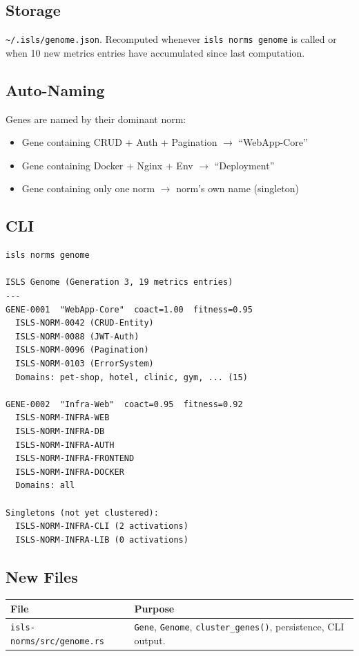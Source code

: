 \documentclass[11pt,a4paper]{article}
\begin{document}
\subsection{Storage}

\texttt{\textasciitilde/.isls/genome.json}. Recomputed whenever 
\texttt{isls norms genome} is called or when 10 new metrics 
entries have accumulated since last computation.

\subsection{Auto-Naming}

Genes are named by their dominant norm:
\begin{itemize}[nosep]
\item Gene containing CRUD + Auth + Pagination $\to$ ``WebApp-Core''
\item Gene containing Docker + Nginx + Env $\to$ ``Deployment''
\item Gene containing only one norm $\to$ norm's own name (singleton)
\end{itemize}

\subsection{CLI}

\begin{lstlisting}[style=bash]
isls norms genome

ISLS Genome (Generation 3, 19 metrics entries)
---
GENE-0001  "WebApp-Core"  coact=1.00  fitness=0.95
  ISLS-NORM-0042 (CRUD-Entity)
  ISLS-NORM-0088 (JWT-Auth)
  ISLS-NORM-0096 (Pagination)
  ISLS-NORM-0103 (ErrorSystem)
  Domains: pet-shop, hotel, clinic, gym, ... (15)

GENE-0002  "Infra-Web"  coact=0.95  fitness=0.92
  ISLS-NORM-INFRA-WEB
  ISLS-NORM-INFRA-DB
  ISLS-NORM-INFRA-AUTH
  ISLS-NORM-INFRA-FRONTEND
  ISLS-NORM-INFRA-DOCKER
  Domains: all

Singletons (not yet clustered):
  ISLS-NORM-INFRA-CLI (2 activations)
  ISLS-NORM-INFRA-LIB (0 activations)
\end{lstlisting}

\subsection{New Files}

\begin{longtable}{lp{10cm}}
\toprule
\textbf{File} & \textbf{Purpose} \\
\midrule
\texttt{isls-norms/src/genome.rs}
  & \texttt{Gene}, \texttt{Genome}, \texttt{cluster\_genes()}, 
    persistence, CLI output. \\
\bottomrule
\end{longtable}
\end{document}
